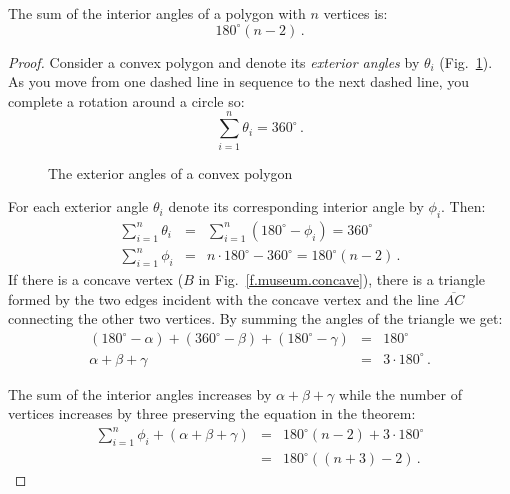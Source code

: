 \begin{theorem}\label{thm.interior-angles-of-a-polygon}
The sum of the interior angles of a polygon with $n$ vertices is:
\[180^\circ(n-2)\,.\]
\end{theorem}
\begin{proof}
Consider a convex polygon and denote its \emph{exterior angles} by $\theta_i$ (Fig.~\ref{f.museum.exterior}).
As you move from one dashed line in sequence to the next dashed line, you complete a rotation around a circle so:
\[
\sum_{i=1}^n \theta_i = 360^\circ\,.
\]
\begin{figure}[t]
\begin{center}
\end{center}
\caption{The exterior angles of a convex polygon}\label{f.museum.exterior}
\end{figure}
For each exterior angle $\theta_i$ denote its corresponding interior angle by $\phi_i$. Then:
\begin{eqnarray*}
\displaystyle\sum_{i=1}^n \theta_i &=&\displaystyle\sum_{i=1}^n (180^\circ-\phi_i)= 360^\circ\\
\displaystyle\sum_{i=1}^n \phi_i &=& n\cdot 180^\circ-360^\circ =180^\circ(n-2)\,.
\end{eqnarray*}
If there is a concave vertex ($B$ in Fig.~\ref{f.museum.concave}), there is a triangle formed by the two edges incident with the concave vertex and the line $\overline{AC}$ connecting the other two vertices. By summing the angles of the triangle we get:
\begin{eqnarray*}
(180^\circ - \alpha) + (360^\circ - \beta) + (180^\circ - \gamma) &=& 180^\circ\\
\alpha + \beta + \gamma &=& 3\cdot 180^\circ\,.
\end{eqnarray*}

The sum of the interior angles increases by $\alpha+\beta+\gamma$ while the number of vertices increases by three preserving the equation in the theorem:
\begin{eqnarray*}
\displaystyle\sum_{i=1}^n \phi_i + (\alpha + \beta + \gamma) &=& 180^\circ(n-2)+3\cdot 180^\circ\\
&=& 180^\circ((n+3)-2)\,.
\end{eqnarray*}
\end{proof}

